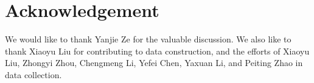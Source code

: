 \section{Acknowledgement}
We would like to thank Yanjie Ze for the valuable discussion. We also like to thank Xiaoyu Liu for contributing to data construction, and the efforts of Xiaoyu Liu, Zhongyi Zhou, Chengmeng Li, Yefei Chen, Yaxuan Li, and Peiting Zhao in data collection.